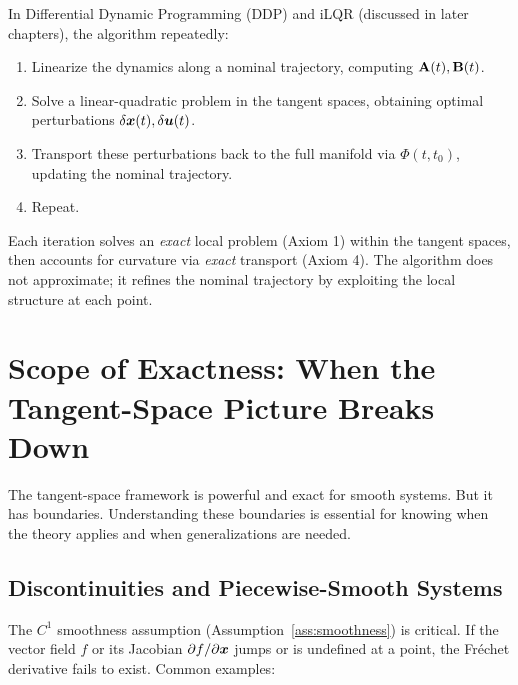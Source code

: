 In Differential Dynamic Programming (DDP) and iLQR (discussed in later chapters), the algorithm
repeatedly:
\begin{enumerate}
\item Linearize the dynamics along a nominal trajectory, computing $\mathbf{A}(t), \mathbf{B}(t)$.
\item Solve a linear-quadratic problem in the tangent spaces, obtaining optimal perturbations $\delta\bm{x}(t), \delta\bm{u}(t)$.
\item Transport these perturbations back to the full manifold via $\Phi(t, t_0)$, updating the nominal trajectory.
\item Repeat.
\end{enumerate}

Each iteration solves an \emph{exact} local problem (Axiom 1) within the tangent spaces,
then accounts for curvature via \emph{exact} transport (Axiom 4). The algorithm does not
approximate; it refines the nominal trajectory by exploiting the local structure at each point.


\section{Scope of Exactness: When the Tangent-Space Picture Breaks Down}

The tangent-space framework is powerful and exact for smooth systems. But it has boundaries.
Understanding these boundaries is essential for knowing when the theory applies and when
generalizations are needed.

\subsection{Discontinuities and Piecewise-Smooth Systems}

The $C^1$ smoothness assumption (Assumption~\ref{ass:smoothness}) is critical. If the vector
field $f$ or its Jacobian $\partial f / \partial \bm{x}$ jumps or is undefined at a point, the
Fréchet derivative fails to exist. Common examples:


